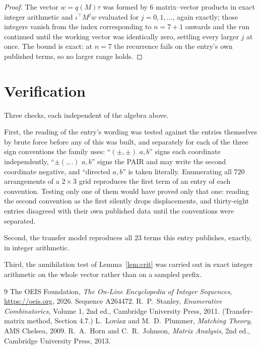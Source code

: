 \documentclass[11pt,a4paper]{article}
\theoremstyle{plain}
\theoremstyle{definition}
\begin{document}
\begin{proof}
The vector $w=q(M)\tau$ was formed by $6$ matrix--vector products in exact integer
arithmetic and $\iota^{\!\top}M^{j}w$ evaluated for $j=0,1,\dots$, again exactly; those
integers vanish from the index corresponding to $n=7+1$ onwards and the run continued
until the working vector was identically zero, settling every larger $j$ at once. The bound is exact: at $n=7$ the recurrence fails on the entry's own published terms, so no larger range holds.
\end{proof}

\section{Verification}

Three checks, each independent of the algebra above.

First, the reading of the entry's wording was tested against the entries themselves by brute
force before any of this was built, and separately for each of the three sign conventions the
family uses: ``$(\pm,\pm)$ $a,b$'' signs each coordinate independently, ``$\pm(.,.)$ $a,b$''
signs the PAIR and may write the second coordinate negative, and ``directed $a,b$'' is taken
literally. Enumerating all $720$ arrangements of a $2\times3$ grid reproduces the first term
of an entry of each convention. Testing only one of them would have proved only that one:
reading the second convention as the first silently drops displacements, and thirty-eight
entries disagreed with their own published data until the conventions were separated.

Second, the transfer model reproduces all $23$ terms this entry publishes, exactly, in
integer arithmetic.

Third, the annihilation test of Lemma~\ref{lem:crit} was carried out in exact integer
arithmetic on the whole vector rather than on a sampled prefix.

\begin{thebibliography}{9}
 The OEIS Foundation, \emph{The On-Line Encyclopedia of Integer
Sequences}, \url{https://oeis.org}, 2026. Sequence A264472.
 R.~P.~Stanley, \emph{Enumerative Combinatorics}, Volume 1, 2nd ed.,
Cambridge University Press, 2011. (Transfer-matrix method, Section 4.7.)
 L.~Lov\'asz and M.~D.~Plummer, \emph{Matching Theory}, AMS Chelsea, 2009.
 R.~A.~Horn and C.~R.~Johnson, \emph{Matrix Analysis}, 2nd ed., Cambridge
University Press, 2013.
\end{thebibliography}
\end{document}
